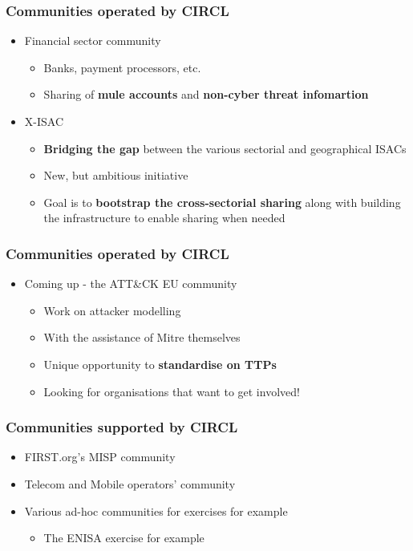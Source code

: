 \begin{frame}
\frametitle{Communities operated by CIRCL}
\begin{itemize}
	\item Financial sector community
	\begin{itemize}
		\item Banks, payment processors, etc.
		\item Sharing of {\bf mule accounts} and {\bf non-cyber threat infomartion}
	\end{itemize}
	\item X-ISAC
	\begin{itemize}
		\item {\bf Bridging the gap} between the various sectorial and geographical ISACs
		\item New, but ambitious initiative
		\item Goal is to {\bf bootstrap the cross-sectorial sharing} along with building the infrastructure to enable sharing when needed
	\end{itemize}
\end{itemize}
\end{frame}

\begin{frame}
\frametitle{Communities operated by CIRCL}
\begin{itemize}
	\item Coming up - the ATT\&CK EU community
	\begin{itemize}
		\item Work on attacker modelling
		\item With the assistance of Mitre themselves
		\item Unique opportunity to {\bf standardise on TTPs}
		\item Looking for organisations that want to get involved!
	\end{itemize}
\end{itemize}
\end{frame}

\begin{frame}
\frametitle{Communities supported by CIRCL}
\begin{itemize}
	\item FIRST.org's MISP community
	\item Telecom and Mobile operators' community
	\item Various ad-hoc communities for exercises for example
	\begin{itemize}
		\item The ENISA exercise for example
	\end{itemize}
\end{itemize}
\end{frame}


